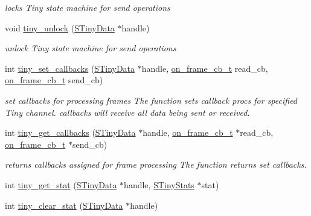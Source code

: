 \begin{DoxyCompactItemize}
\begin{DoxyCompactList}\small\item\em locks Tiny state machine for send operations \end{DoxyCompactList}\item 
void \hyperlink{group__ADVANCED__API_gae4bfad55a4ef5814a5af50f044f6d7cd}{tiny\+\_\+unlock} (\hyperlink{structSTinyData}{S\+Tiny\+Data} $\ast$handle)
\begin{DoxyCompactList}\small\item\em unlock Tiny state machine for send operations \end{DoxyCompactList}\item 
int \hyperlink{group__ADVANCED__API_gac562103dd1699b82fddf29dccdc0ec7c}{tiny\+\_\+set\+\_\+callbacks} (\hyperlink{structSTinyData}{S\+Tiny\+Data} $\ast$handle, \hyperlink{tiny__types_8h_ad6bf709565b8aecb9e6ecf196f219d54}{on\+\_\+frame\+\_\+cb\+\_\+t} read\+\_\+cb, \hyperlink{tiny__types_8h_ad6bf709565b8aecb9e6ecf196f219d54}{on\+\_\+frame\+\_\+cb\+\_\+t} send\+\_\+cb)
\begin{DoxyCompactList}\small\item\em set callbacks for processing frames The function sets callback procs for specified Tiny channel. callbacks will receive all data being sent or received. \end{DoxyCompactList}\item 
int \hyperlink{group__ADVANCED__API_gabe38a1f81966f6901eb2f6969b568298}{tiny\+\_\+get\+\_\+callbacks} (\hyperlink{structSTinyData}{S\+Tiny\+Data} $\ast$handle, \hyperlink{tiny__types_8h_ad6bf709565b8aecb9e6ecf196f219d54}{on\+\_\+frame\+\_\+cb\+\_\+t} $\ast$read\+\_\+cb, \hyperlink{tiny__types_8h_ad6bf709565b8aecb9e6ecf196f219d54}{on\+\_\+frame\+\_\+cb\+\_\+t} $\ast$send\+\_\+cb)
\begin{DoxyCompactList}\small\item\em returns callbacks assigned for frame processing The function returns set callbacks. \end{DoxyCompactList}\item 
int \hyperlink{group__ADVANCED__API_ga5f61774b2027a91f772f31d943acdd3f}{tiny\+\_\+get\+\_\+stat} (\hyperlink{structSTinyData}{S\+Tiny\+Data} $\ast$handle, \hyperlink{structSTinyStats}{S\+Tiny\+Stats} $\ast$stat)
\item 
int \hyperlink{group__ADVANCED__API_gac75ee03ea3691b0a8bf842d764b342d9}{tiny\+\_\+clear\+\_\+stat} (\hyperlink{structSTinyData}{S\+Tiny\+Data} $\ast$handle)
\end{DoxyCompactItemize}


